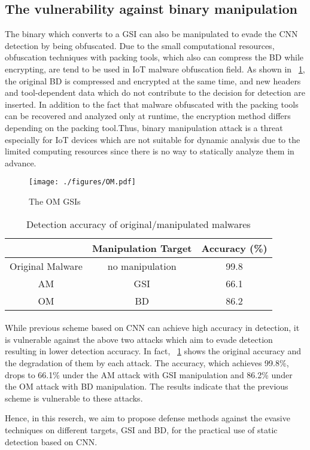 \subsection{The vulnerability against binary manipulation}
The binary which converts to a GSI can also be manipulated to evade the CNN detection by being obfuscated.
Due to the small computational resources, obfuscation techniques with packing tools, which also can compress the BD while encrypting, are tend to be used in IoT malware obfuscation field.
As shown in \figurename~\ref{fig:omGSI}, the original BD is compressed and encrypted at the same time, and new headers and tool-dependent data which do not contribute to the decision for detection are inserted.
In addition to the fact that malware obfuscated with the packing tools can be recovered and analyzed only at runtime, the encryption method differs depending on the packing tool.Thus, binary manipulation attack is a threat especially for IoT devices which are not suitable for dynamic analysis due to the limited computing resources since there is no way to statically analyze them in advance.

\begin{figure}[p]
 \centering
 \hspace{-55pt}
 \texttt{[image: ./figures/OM.pdf]}
 \caption{The OM GSIs} 
 \label{fig:omGSI}
\end{figure}
\begin{table}[p]
  \begin{center}
    \caption{Detection accuracy of original/manipulated malwares}
    \label{tab:prev} 
    \begin{tabular}{|c|c|c|} \hline
       & Manipulation Target & Accuracy (\%) \\ \hline \hline
      Original Malware & no manipulation  & 99.8  \\ \hline
      AM & GSI & 66.1  \\ \hline 
      OM & BD & 86.2 \\ \hline
    \end{tabular}
  \end{center}
\end{table} 
\afterpage{\clearpage}
\newpage

\paragraph*{}
While previous scheme based on CNN can achieve high accuracy in detection, it is vulnerable against the above two attacks which aim to evade detection resulting in lower detection accuracy.
In fact, \tablename~\ref{tab:prev} shows the original accuracy and the degradation of them by each attack.
The accuracy, which achieves 99.8\%, drops to 66.1\% under the AM attack with GSI manipulation and 86.2\% under the OM attack with BD manipulation.
The results indicate that the previous scheme is vulnerable to these attacks.

Hence, in this reserch, we aim to propose defense methods against the evasive techniques on different targets, GSI and BD, for the practical use of static detection based on CNN.

\newpage
